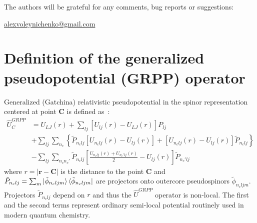\documentclass[12pt]{article}
\begin{document}
The authors will be grateful for any comments, bug reports or suggestions:

\noindent
\href{mailto:alexvoleynichenko@gmail.com}{alexvoleynichenko@gmail.com}

\section{Definition of the generalized pseudopotential (GRPP) operator}

Generalized (Gatchina) relativistic pseudopotential in the spinor representation centered at point $\bm{C}$ is
defined as~\cite{Titov:99}:
%
\begin{align}
\hat{U}^{GRPP}_{C} &= U_{LJ}(r) + \sum_{lj} \left[ U_{lj}(r) - U_{LJ}(r) \right] P_{lj} \nonumber \\
&+ \sum_{lj} \sum_{n_c}
\left\{
\tilde{P}_{n_clj}
\left[ U_{n_clj}(r) - U_{lj}(r)\right] +
\left[U_{n_clj}(r) - U_{lj}(r)\right] \tilde{P}_{n_clj}
\right\}
\label{eq:grpp-def} \\
&- \sum_{lj} \sum_{n_cn_c'} \tilde{P}_{n_clj}
\left[\frac{U_{n_clj}(r) + U_{n_c'lj}(r)}{2} - U_{lj}(r) \right] \tilde{P}_{n_c'lj} \nonumber
\end{align}
%
where $r = |\bm{r} - \bm{C}|$ is the distance to the point $\bm{C}$ and $\tilde{P}_{n_clj} = \sum_{m} \ket{\tilde{\phi}_{n_cljm}} \bra{\tilde{\phi}_{n_cljm}}$ are projectors onto outercore pseudospinors $\tilde{\phi}_{n_cljm}$. Projectors $\tilde{P}_{n_clj}$ depend on $r$ and thus the $\hat{U}^{GRPP}$ operator is non-local. The first and the second terms represent ordinary semi-local potential routinely used in modern quantum chemistry.
\end{document}
